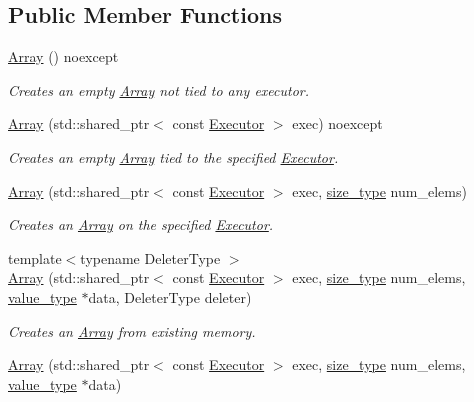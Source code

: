 \subsection*{Public Member Functions}
\begin{DoxyCompactItemize}
\item 
\hyperlink{classgko_1_1Array_a6048d48c206e8dcae55e776b7adba06a}{Array} () noexcept
\begin{DoxyCompactList}\small\item\em Creates an empty \hyperlink{classgko_1_1Array}{Array} not tied to any executor. \end{DoxyCompactList}\item 
\hyperlink{classgko_1_1Array_ae64e4c698ecef2cfbe3ceb3dfd07dbaf}{Array} (std\+::shared\+\_\+ptr$<$ const \hyperlink{classgko_1_1Executor}{Executor} $>$ exec) noexcept
\begin{DoxyCompactList}\small\item\em Creates an empty \hyperlink{classgko_1_1Array}{Array} tied to the specified \hyperlink{classgko_1_1Executor}{Executor}. \end{DoxyCompactList}\item 
\hyperlink{classgko_1_1Array_a2cf49c2f39cbad160982d731fcf74031}{Array} (std\+::shared\+\_\+ptr$<$ const \hyperlink{classgko_1_1Executor}{Executor} $>$ exec, \hyperlink{namespacegko_a6e5c95df0ae4e47aab2f604a22d98ee7}{size\+\_\+type} num\+\_\+elems)
\begin{DoxyCompactList}\small\item\em Creates an \hyperlink{classgko_1_1Array}{Array} on the specified \hyperlink{classgko_1_1Executor}{Executor}. \end{DoxyCompactList}\item 
{\footnotesize template$<$typename Deleter\+Type $>$ }\\\hyperlink{classgko_1_1Array_a4aa436a039fe6a6391b810a44d0ca9c7}{Array} (std\+::shared\+\_\+ptr$<$ const \hyperlink{classgko_1_1Executor}{Executor} $>$ exec, \hyperlink{namespacegko_a6e5c95df0ae4e47aab2f604a22d98ee7}{size\+\_\+type} num\+\_\+elems, \hyperlink{classgko_1_1Array_ad40c95e429262175cae51bcabd291a5b}{value\+\_\+type} $\ast$data, Deleter\+Type deleter)
\begin{DoxyCompactList}\small\item\em Creates an \hyperlink{classgko_1_1Array}{Array} from existing memory. \end{DoxyCompactList}\item 
\hyperlink{classgko_1_1Array_afdf9ea91228cf272e3b5f18cc5dff2a8}{Array} (std\+::shared\+\_\+ptr$<$ const \hyperlink{classgko_1_1Executor}{Executor} $>$ exec, \hyperlink{namespacegko_a6e5c95df0ae4e47aab2f604a22d98ee7}{size\+\_\+type} num\+\_\+elems, \hyperlink{classgko_1_1Array_ad40c95e429262175cae51bcabd291a5b}{value\+\_\+type} $\ast$data)

\end{DoxyCompactItemize}
